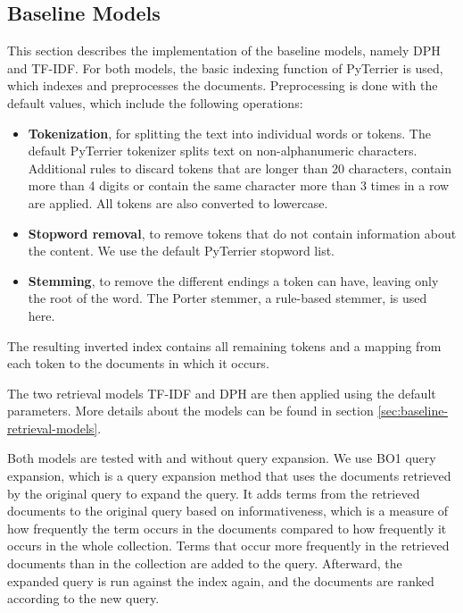 \subsection{Baseline Models}
This section describes the implementation of the baseline models, namely DPH and TF-IDF.
For both models, the basic indexing function of PyTerrier is used, which indexes and preprocesses the documents.
Preprocessing is done with the default values, which include the following operations:
\begin{itemize}
    \item{\textbf{Tokenization}, for splitting the text into individual words or tokens. The default PyTerrier tokenizer splits text on non-alphanumeric characters. Additional rules to discard tokens that are longer than 20 characters, contain more than 4 digits or contain the same character more than 3 times in a row are applied. All tokens are also converted to lowercase.}
    \item \textbf{Stopword removal}, to remove tokens that do not contain information about the content. We use the default PyTerrier stopword list.
    \item \textbf{Stemming}, to remove the different endings a token can have, leaving only the root of the word. The Porter stemmer, a rule-based stemmer, is used here.
\end{itemize}
The resulting inverted index contains all remaining tokens and a mapping from each token to the documents in which it occurs.

The two retrieval models TF-IDF and DPH are then applied using the default parameters.
More details about the models can be found in section \ref{sec:baseline-retrieval-models}.


Both models are tested with and without query expansion.
We use BO1 query expansion, which is a query expansion method that uses the documents retrieved by the original query to expand the query.
It adds terms from the retrieved documents to the original query based on informativeness, which is a measure of how frequently the term occurs in the documents compared to how frequently it occurs in the whole collection.
Terms that occur more frequently in the retrieved documents than in the collection are added to the query.
Afterward, the expanded query is run against the index again, and the documents are ranked according to the new query.



